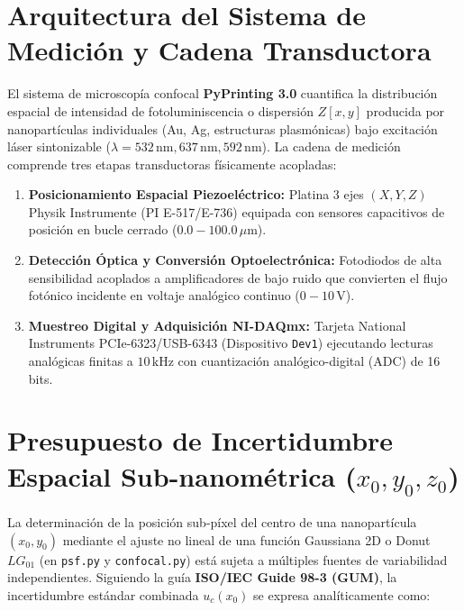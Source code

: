 \documentclass[11pt,a4paper]{article}
\begin{document}
\vspace{0.4cm}

\section{Arquitectura del Sistema de Medición y Cadena Transductora}

El sistema de microscopía confocal \textbf{PyPrinting 3.0} cuantifica la distribución espacial de intensidad de fotoluminiscencia o dispersión $Z[x,y]$ producida por nanopartículas individuales (Au, Ag, estructuras plasmónicas) bajo excitación láser sintonizable ($\lambda = 532\,\text{nm}, 637\,\text{nm}, 592\,\text{nm}$). La cadena de medición comprende tres etapas transductoras físicamente acopladas:

\begin{enumerate}[leftmargin=*]
    \item \textbf{Posicionamiento Espacial Piezoeléctrico:} Platina 3 ejes $(X,Y,Z)$ Physik Instrumente (PI E-517/E-736) equipada con sensores capacitivos de posición en bucle cerrado ($0.0 - 100.0\,\mu\text{m}$).
    \item \textbf{Detección Óptica y Conversión Optoelectrónica:} Fotodiodos de alta sensibilidad acoplados a amplificadores de bajo ruido que convierten el flujo fotónico incidente en voltaje analógico continuo ($0 - 10\,\text{V}$).
    \item \textbf{Muestreo Digital y Adquisición NI-DAQmx:} Tarjeta National Instruments PCIe-6323/USB-6343 (Dispositivo \texttt{Dev1}) ejecutando lecturas analógicas finitas a $10\,\text{kHz}$ con cuantización analógico-digital (ADC) de 16 bits.
\end{enumerate}

\section{Presupuesto de Incertidumbre Espacial Sub-nanométrica ($x_0, y_0, z_0$)}

La determinación de la posición sub-píxel del centro de una nanopartícula $(x_0, y_0)$ mediante el ajuste no lineal de una función Gaussiana 2D o Donut $LG_{01}$ (en \texttt{psf.py} y \texttt{confocal.py}) está sujeta a múltiples fuentes de variabilidad independientes. Siguiendo la guía \textbf{ISO/IEC Guide 98-3 (GUM)}, la incertidumbre estándar combinada $u_c(x_0)$ se expresa analíticamente como:
\end{document}
